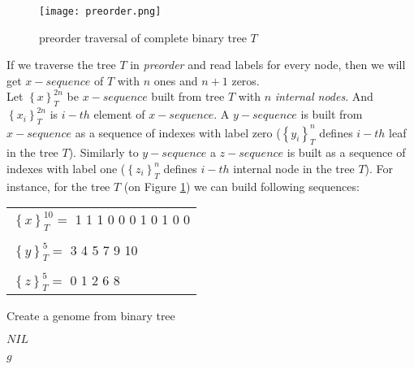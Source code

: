 \documentclass[12pt]{article}
\newlength\singleindent
\newcommand\bindent{%
  \begingroup
  \setlength{\itemindent}{\singleindent}
  \addtolength{\algorithmicindent}{\singleindent}
}
\newcommand\eindent{\endgroup}
\begin{document}
\begin{figure}[ht]
\centering
\texttt{[image: preorder.png]}
\caption{preorder traversal of complete binary tree $T$}
\label{fig:preorder}
\end{figure}

If we traverse the tree $T$ in \textit{preorder} and read labels for every node, then we will get $x-sequence$ of $T$ with $n$ ones and $n+1$ zeros.\\
Let $\left\{x\right\}_{T}^{2n}$ be $x-sequence$ built from tree $T$ with $n$  \textit{internal nodes}. And $\left\{x_i\right\}_{T}^{2n}$  is $i-th$ element of $x-sequence$.
A $y-sequence$ is built from $x-sequence$ as a sequence of indexes with label zero ($\left\{y_i\right\}_{T}^{n}$ defines $i-th$ leaf in the tree $T$).
Similarly to $y-sequence$ a $z-sequence$ is built as a sequence of indexes with label one ($\left\{z_i\right\}_{T}^{n}$ defines $i-th$ internal node in the tree $T$).
For instance, for the tree $T$ (on Figure \ref{fig:preorder}) we can build following sequences:

\begin{tabular}{l}
\small
    $\left\{x\right\}_{T}^{10} =$ 1 1 1 0 0 0 1 0 1 0 0\\
    \\
\small
    $\left\{y\right\}_{T}^{5} = $ 3 4 5 7 9 10\\
    \\
\small
    $\left\{z\right\}_{T}^{5} = $ 0 1 2 6 8\\
\end{tabular}

\begin{algorithm}
\scriptsize
\caption{Create a genome from binary tree}
\begin{algorithmic}[]
    \bindent
            \RETURN $NIL$
        \ENDIF

            \ELSE
            \ENDIF
        \ENDIF

            \ELSE
            \ENDIF
        \ENDIF

        \RETURN $g$
    \eindent
\end{algorithmic}
\end{algorithm}
\end{document}
